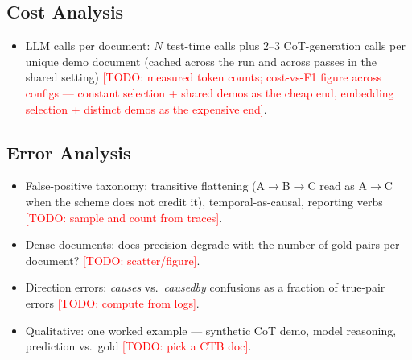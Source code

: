\documentclass[11pt]{article}
\newcommand{\todo}[1]{\textcolor{red}{[TODO: #1]}}
\begin{document}
\subsection{Cost Analysis}
\label{sec:cost}
\begin{itemize}
  \item LLM calls per document: $N$ test-time calls plus $2$--$3$
        CoT-generation calls per unique demo document (cached across the run
        and across passes in the shared setting) \todo{measured token counts;
        cost-vs-F1 figure across configs --- constant selection + shared demos
        as the cheap end, embedding selection + distinct demos as the
        expensive end}.
\end{itemize}

\subsection{Error Analysis}
\begin{itemize}
  \item False-positive taxonomy: transitive flattening (A$\to$B$\to$C read as
        A$\to$C when the scheme does not credit it), temporal-as-causal,
        reporting verbs \todo{sample and count from traces}.
  \item Dense documents: does precision degrade with the number of gold pairs
        per document? \todo{scatter/figure}.
  \item Direction errors: \textit{causes} vs.\ \textit{causedby} confusions
        as a fraction of true-pair errors \todo{compute from logs}.
  \item Qualitative: one worked example --- synthetic CoT demo, model reasoning,
        prediction vs.\ gold \todo{pick a CTB doc}.
\end{itemize}

\end{document}
